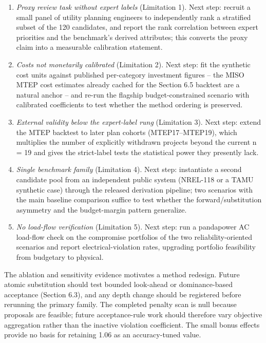 \documentclass[
]{article}
\providecommand{\tightlist}{%
  \setlength{\itemsep}{0pt}\setlength{\parskip}{0pt}}
\begin{document}
\begin{enumerate}
\def\labelenumi{\arabic{enumi}.}
\tightlist
\item
  \emph{Proxy review task without expert labels} (Limitation 1). Next step: recruit a small panel of utility planning engineers to independently rank a stratified subset of the 120 candidates, and report the rank correlation between expert priorities and the benchmark's derived attributes; this converts the proxy claim into a measurable calibration statement.
\item
  \emph{Costs not monetarily calibrated} (Limitation 2). Next step: fit the synthetic cost units against published per-category investment figures -- the MISO MTEP cost estimates already cached for the Section 6.5 backtest are a natural anchor -- and re-run the flagship budget-constrained scenario with calibrated coefficients to test whether the method ordering is preserved.
\item
  \emph{External validity below the expert-label rung} (Limitation 3). Next step: extend the MTEP backtest to later plan cohorts (MTEP17--MTEP19), which multiplies the number of explicitly withdrawn projects beyond the current n = 19 and gives the strict-label tests the statistical power they presently lack.
\item
  \emph{Single benchmark family} (Limitation 4). Next step: instantiate a second candidate pool from an independent public system (NREL-118 or a TAMU synthetic case) through the released derivation pipeline; two scenarios with the main baseline comparison suffice to test whether the forward/substitution asymmetry and the budget-margin pattern generalize.
\item
  \emph{No load-flow verification} (Limitation 5). Next step: run a pandapower AC load-flow check on the compromise portfolios of the two reliability-oriented scenarios and report electrical-violation rates, upgrading portfolio feasibility from budgetary to physical.
\end{enumerate}

The ablation and sensitivity evidence motivates a method redesign. Future atomic substitution should test bounded look-ahead or dominance-based acceptance (Section 6.3), and any depth change should be registered before rerunning the primary family. The completed penalty scan is null because proposals are feasible; future acceptance-rule work should therefore vary objective aggregation rather than the inactive violation coefficient. The small bonus effects provide no basis for retaining 1.06 as an accuracy-tuned value.
\end{document}
